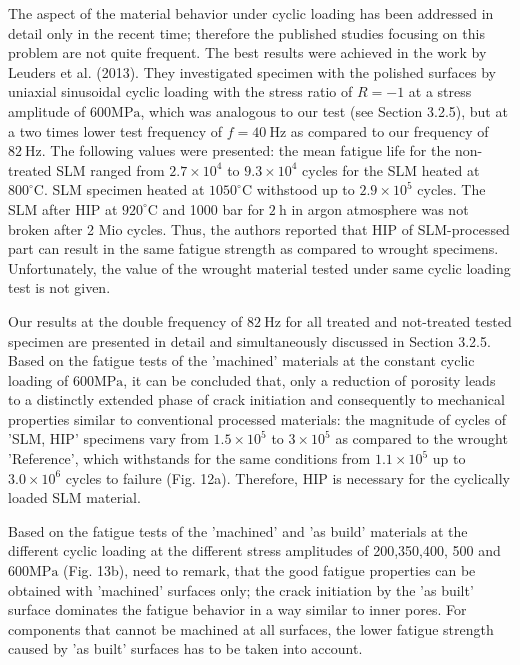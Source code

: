 \documentclass[10pt]{article}
\begin{document}
The aspect of the material behavior under cyclic loading has been addressed in detail only in the recent time; therefore the published studies focusing on this problem are not quite frequent. The best results were achieved in the work by Leuders et al. (2013). They investigated specimen with the polished surfaces by uniaxial sinusoidal cyclic loading with the stress ratio of $R=-1$ at a stress amplitude of $600 \mathrm{MPa}$, which was analogous to our test (see Section 3.2.5), but at a two times lower test frequency of $f=40 \mathrm{~Hz}$ as compared to our frequency of $82 \mathrm{~Hz}$. The following values were presented: the mean fatigue life for the non-treated SLM ranged from $2.7 \times 10^{4}$ to $9.3 \times 10^{4}$ cycles for the SLM heated at $800^{\circ} \mathrm{C}$. SLM specimen heated at $1050^{\circ} \mathrm{C}$ withstood up to $2.9 \times 10^{5}$ cycles. The SLM after HIP at $920^{\circ} \mathrm{C}$ and 1000 bar for $2 \mathrm{~h}$ in argon atmosphere was not broken after 2 Mio cycles. Thus, the authors reported that HIP of SLM-processed part can result in the same fatigue strength as compared to wrought specimens. Unfortunately, the value of the wrought material tested under same cyclic loading test is not given.

Our results at the double frequency of $82 \mathrm{~Hz}$ for all treated and not-treated tested specimen are presented in detail and simultaneously discussed in Section 3.2.5. Based on the fatigue tests of the 'machined' materials at the constant cyclic loading of $600 \mathrm{MPa}$, it can be concluded that, only a reduction of porosity leads to a distinctly extended phase of crack initiation and consequently to mechanical properties similar to conventional processed materials: the magnitude of cycles of 'SLM, HIP' specimens vary from $1.5 \times 10^{5}$ to $3 \times 10^{5}$ as compared to the wrought 'Reference', which withstands for the same conditions from $1.1 \times 10^{5}$ up to $3.0 \times 10^{6}$ cycles to failure (Fig. 12a). Therefore, HIP is necessary for the cyclically loaded SLM material.

Based on the fatigue tests of the 'machined' and 'as build' materials at the different cyclic loading at the different stress amplitudes of 200,350,400, 500 and $600 \mathrm{MPa}$ (Fig. 13b), need to remark, that the good fatigue properties can be obtained with 'machined' surfaces only; the crack initiation by the 'as built' surface dominates the fatigue behavior in a way similar to inner pores. For components that cannot be machined at all surfaces, the lower fatigue strength caused by 'as built' surfaces has to be taken into account.
\end{document}
